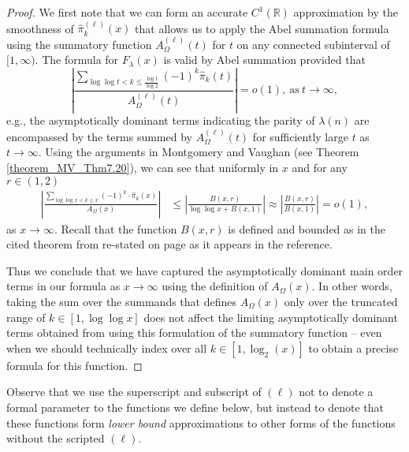 \documentclass[11pt,reqno,a4letter]{article}
\numberwithin{figure}{section}
\numberwithin{table}{section}
\theoremstyle{plain}
\numberwithin{theorem}{section}
\theoremstyle{definition}
\begin{document}
\begin{proof} 
We first note that we can form an accurate $C^{1}(\mathbb{R})$ approximation by the smoothness of 
$\widehat{\pi}_k^{(\ell)}(x)$ that allows us to apply the Abel summation formula using the summatory 
function $A_{\Omega}^{(\ell)}(t)$ for $t$ on any connected subinterval of $[1, \infty)$. 
The formula for $F_{\lambda}(x)$ is valid by Abel summation provided that 
\[
\left\lvert \frac{\displaystyle\sum\limits_{\log\log t < k \leq \frac{\log t}{\log 2}} 
     (-1)^k \widehat{\pi}_k(t)}{A_{\Omega}^{(\ell)}(t)}\right\rvert = o(1), 
     \mathrm{\ as\ } t \rightarrow \infty, 
\]
e.g., the asymptotically dominant terms indicating the parity of 
$\lambda(n)$ are encompassed by the terms summed by $A_{\Omega}^{(\ell)}(t)$ for 
sufficiently large $t$ as $t \rightarrow \infty$. 
Using the arguments in Montgomery and Vaughan \cite[\S 7; Thm.\ 7.20]{MV} (see 
Theorem \ref{theorem_MV_Thm7.20}), we can see that 
uniformly in $x$ and for any $r \in (1, 2)$ 
\begin{align} 
\label{eqn_ProbCLT_for_Omegan_cited_result} 
\left\lvert \frac{\sum\limits_{\log\log x < k \leq x} (-1)^k \cdot \widehat{\pi}_k(x)}{A_{\Omega}(x)} \right\rvert & \leq 
     \left\lvert \frac{B(x, r)}{\log\log x + B(x, 1)} \right\rvert 
     \approx \left\lvert \frac{B(x, r)}{B(x, 1)} \right\rvert = o(1), 
\end{align} 
as $x \rightarrow \infty$. 
Recall that the function $B(x, r)$ is defined and bounded 
as in the cited theorem from \cite{MV} re-stated on page 
\pageref{theorem_MV_Thm7.20-init_stmt} as it appears in the reference. 

Thus we conclude that we have captured the asymptotically dominant main order terms in our formula as 
$x \rightarrow \infty$ using the definition of $A_{\Omega}(x)$. 
In other words, taking the sum over the summands that defines $A_{\Omega}(x)$ only over the truncated range of 
$k \in [1, \log\log x]$ does not affect the limiting asymptotically 
dominant terms obtained from using this formulation of the summatory function -- even when we should technically 
index over all $k \in [1, \log_2(x)]$ to obtain a precise formula for this function. 
\end{proof} 

Observe that we use the superscript and subscript of $(\ell)$ not to denote a formal parameter to 
the functions we define below, but instead to denote that these functions form \emph{lower bound} 
approximations to other forms of the functions without the scripted $(\ell)$. 
\end{document}

